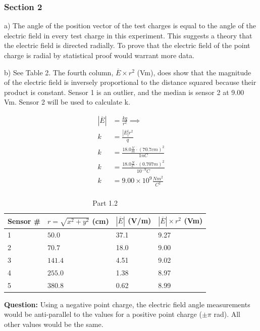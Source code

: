 \documentclass{article}
\begin{document}
\subsubsection{Section 2}%
\label{ssub:part_2}

a) The angle of the position vector of the test charges is equal to the angle of the electric field
in every test charge in this experiment. This suggests a theory that the electric field is directed radially.
To prove that the electric field of the point charge is radial by
statistical proof would warrant more data.

b) See Table 2. The fourth column, $\overline{E} \times  r^2$ (Vm), does show that the magnitude of
the electric field is inversely proportional to the distance squared because their product is constant.
Sensor 1 is an outlier, and the median is sensor 2 at 9.00 Vm. Sensor 2 will be used to calculate k.

\begin{align*}
\left| \overline{E} \right| &=  \frac{kq}{r^2} \implies \\
k &= \frac{\left| \overline{E} \right| r^2}{q} \\
k &= \frac{18.0 \frac{V}{m} \cdot (70.7 cm)^2}{1nC} \\
k &= \frac{18.0 \frac{N}{C} \cdot (0.707 m)^2}{10^{-9}C} \\
k &= \boxed{9.00 \times 10^{9}\frac{Nm^2}{C^2} }\\
\end{align*}


\begin{table}[htpb]
	\centering
	\caption{Part 1.2}
	\label{tab:label}
	\begin{tabular}{| l | l | l | l |}
	\hline
	\tiny Sensor \# &  \tiny$r = \sqrt{x^2+y^2} $ (cm) & \tiny$\left| \overline{E} \right| $ (V/m) & \tiny $\left| \overline{E} \right| \times r^2$ (Vm)\\
	\hline
	1  &   $50.0$ &  37.1 & 9.27\\
	\hline
	2  &   $70.7$&  18.0 & 9.00\\
	\hline
	3  &   $141.4$  & 4.51 & 9.02\\
	\hline
	4  &   $255.0$ & 1.38 & 8.97\\
	\hline
	5  &  $380.8$  & 0.62 & 8.99\\
	\hline
	\end{tabular}
\end{table}


\textbf{Question:} Using a negative point charge, the electric field angle measurements
would be anti-parallel to the values for a positive point charge ($\pm \pi$ rad). All other
values would be the same.
\end{document}
